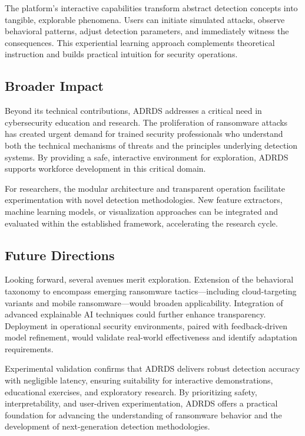The platform's interactive capabilities transform abstract detection concepts into tangible, explorable phenomena. Users can initiate simulated attacks, observe behavioral patterns, adjust detection parameters, and immediately witness the consequences. This experiential learning approach complements theoretical instruction and builds practical intuition for security operations.

\subsection{Broader Impact}

Beyond its technical contributions, ADRDS addresses a critical need in cybersecurity education and research. The proliferation of ransomware attacks has created urgent demand for trained security professionals who understand both the technical mechanisms of threats and the principles underlying detection systems. By providing a safe, interactive environment for exploration, ADRDS supports workforce development in this critical domain.

For researchers, the modular architecture and transparent operation facilitate experimentation with novel detection methodologies. New feature extractors, machine learning models, or visualization approaches can be integrated and evaluated within the established framework, accelerating the research cycle.

\subsection{Future Directions}

Looking forward, several avenues merit exploration. Extension of the behavioral taxonomy to encompass emerging ransomware tactics—including cloud-targeting variants and mobile ransomware—would broaden applicability. Integration of advanced explainable AI techniques could further enhance transparency. Deployment in operational security environments, paired with feedback-driven model refinement, would validate real-world effectiveness and identify adaptation requirements.

Experimental validation confirms that ADRDS delivers robust detection accuracy with negligible latency, ensuring suitability for interactive demonstrations, educational exercises, and exploratory research. By prioritizing safety, interpretability, and user-driven experimentation, ADRDS offers a practical foundation for advancing the understanding of ransomware behavior and the development of next-generation detection methodologies.

